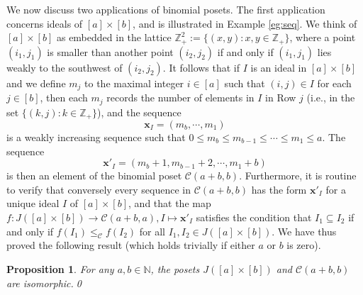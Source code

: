 \documentclass[11pt]{amsart}
\theoremstyle{plain}
\newtheorem{proposition}[theorem]{Proposition}
\theoremstyle{definition}
\theoremstyle{remark}
\numberwithin{equation}{section}
\newcommand{\Z}{{\mathbb Z}}
\newcommand{\ra}{\rightarrow}
\newcommand{\N}{\mathbb{N}}
\newcommand{\calc}{\mathcal{C}}
\newcommand{\bfx}{\mathbf{x}}
\newcommand{\se}{\subseteq}
\begin{document}
We now discuss two applications of binomial posets. The first application
concerns ideals of $[a]\times [b]$, and is illustrated in Example \ref{eg:seq}.
We think of $[a]\times [b]$ as embedded in the lattice $\Z_+^2 :=\{(x,y): x,y\in
\Z_+\}$, where a point $(i_1, j_1)$ is smaller than another point $(i_2,j_2)$ if
and only if $(i_1,j_1)$ lies weakly to the southwest of $(i_2,j_2)$. It follows that if $I$ is an ideal in $[a]\times [b]$ and
we define $m_j$ to the maximal integer $i\in [a]$ such that $(i,j)\in I$ for
each $j\in [b]$, then each $m_j$ records the number of elements in $I$ in Row
$j$ (i.e., in the set $\{(k,j):k\in \Z_+\}$), and the sequence 
\[ 
    \bfx_I=(m_b, \cdots, m_1) 
\] 
is a weakly increasing sequence such that $0\le m_b \le m_{b-1}\le \cdots\le
m_1\le a$.  The sequence 
\[ \bfx'_I=(m_b+1, m_{b-1}+2, \cdots, m_1+b) \] 
is then an element of the binomial poset $\calc(a+b,b)$.  Furthermore, it is
routine to verify that conversely every sequence in $\calc(a+b,b)$ has the form
$\bfx'_I$ for a unique ideal $I$ of $[a]\times [b]$, and that the map $f:
J([a]\times[b])\ra \calc(a+b,a), I\mapsto \bfx'_I$ satisfies the condition that
$I_1\se I_2$ if and only if $f(I_1)\le_\calc f(I_2)$ for all $I_1, I_2\in
J([a]\times[b])$. We have thus proved the following result (which holds
trivially if either $a$ or $b$ is zero).



\begin{proposition}\label{prop:jab_iso}
For any $a,b\in \N$, the posets  $J([a] \times [b])$ and $\calc(a+b, b)$ are
isomorphic.\qed 
\end{proposition}
\end{document}
